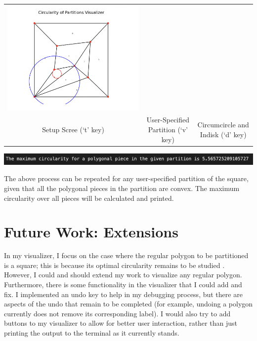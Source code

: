 \documentclass[11pt]{article}
\begin{document}
\begin{center}
\begin{tabular}{c c c}
      \includegraphics[scale=0.33]{CircumcircleAndIndiskOutput.png} \\
      Setup Scree (`t' key) & User-Specified Partition (`v' key) & Circumcircle and Indisk (`d' key)
    \end{tabular}
    \end{center}
    
    \begin{center}
    \includegraphics[width=\linewidth]{CircularityOutput.png}
    \end{center}

The above process can be repeated for any user-specified partition of the square, given that all the polygonal pieces in the partition are convex. The maximum circularity
over all pieces will be calculated and printed.

\section{Future Work: Extensions}

In my visualizer, I focus on the case where the regular polygon to be partitioned is a square; this is because its optimal circularity remains to be studied \cite{damian_rourke}. 
However, I could and should extend my work to visualize any regular polygon. \\

Furthermore, there is some functionality in the visualizer that I could add and fix. I implemented an undo key to help in my debugging process, but there are aspects of the undo that remain to be completed
(for example, undoing a polygon currently does not remove its corresponding label). I would also try to add buttons to my visualizer to allow for better user interaction, rather than just printing the output to the terminal as it currently stands. \\
\end{document}

